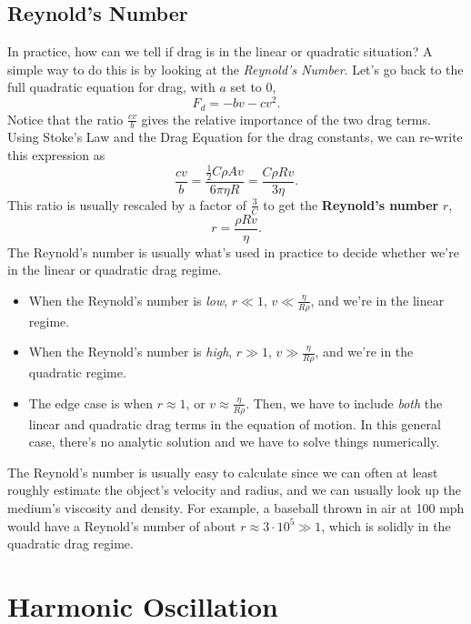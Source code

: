 \documentclass[
  letterpaper,
  DIV=11,
  numbers=noendperiod]{scrreprt}
\providecommand{\tightlist}{%
  \setlength{\itemsep}{0pt}\setlength{\parskip}{0pt}}\usepackage{longtable,booktabs,array}
\begin{document}
\hypertarget{reynolds-number}{%
\subsection{Reynold's Number}\label{reynolds-number}}

In practice, how can we tell if drag is in the linear or quadratic
situation? A simple way to do this is by looking at the \emph{Reynold's
Number}. Let's go back to the full quadratic equation for drag, with
\(a\) set to \(0\), \[
F_d = -bv - cv^2.
\] Notice that the ratio \(\frac{cv}{b}\) gives the relative importance
of the two drag terms. Using Stoke's Law and the Drag Equation for the
drag constants, we can re-write this expression as \[
\frac{cv}{b} = \frac{\frac{1}{2}C \rho Av}{6\pi\eta R} = \frac{C \rho Rv}{3\eta}.
\] This ratio is usually rescaled by a factor of \(\frac{3}{C}\) to get
the \textbf{Reynold's number} \(r\), \[
r = \frac{\rho Rv}{\eta}.
\] The Reynold's number is usually what's used in practice to decide
whether we're in the linear or quadratic drag regime.

\begin{itemize}
\tightlist
\item
  When the Reynold's number is \emph{low}, \(r \ll 1\),
  \(v \ll \frac{\eta}{R\rho}\), and we're in the linear regime.
\item
  When the Reynold's number is \emph{high}, \(r \gg 1\),
  \(v \gg \frac{\eta}{R\rho}\), and we're in the quadratic regime.
\item
  The edge case is when \(r \approx 1\), or
  \(v \approx \frac{\eta}{R\rho}\). Then, we have to include \emph{both}
  the linear and quadratic drag terms in the equation of motion. In this
  general case, there's no analytic solution and we have to solve things
  numerically.
\end{itemize}

The Reynold's number is usually easy to calculate since we can often at
least roughly estimate the object's velocity and radius, and we can
usually look up the medium's viscosity and density. For example, a
baseball thrown in air at 100 mph would have a Reynold's number of about
\(r \approx 3 \cdot 10^5 \gg 1\), which is solidly in the quadratic drag
regime.

\hypertarget{harmonic-oscillation}{%
\section{Harmonic Oscillation}\label{harmonic-oscillation}}
\end{document}
